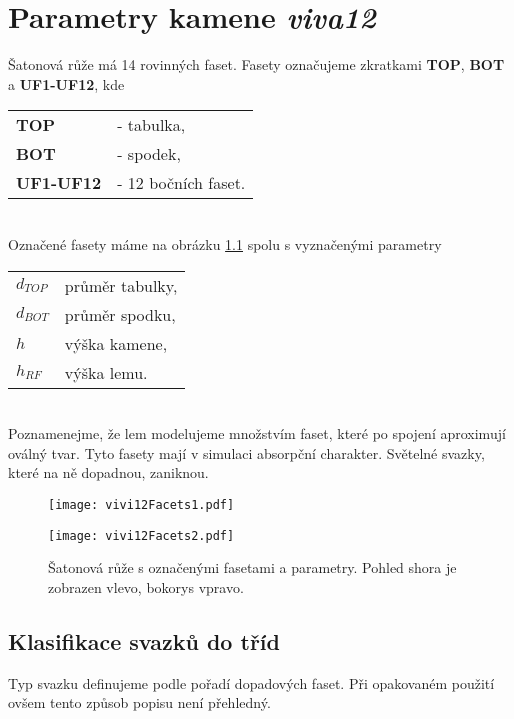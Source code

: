 \chapter{Parametry kamene \textit{viva12}}

Šatonová růže má 14 rovinných faset. Fasety označujeme zkratkami \textbf{TOP}, \textbf{BOT} a \textbf{UF1-UF12}, kde

\begin{tabular}{l l}
\textbf{TOP} & - tabulka,\\
\textbf{BOT} & - spodek,\\
\textbf{UF1-UF12} & - 12 bočních faset.\\
\end{tabular}\\

Označené fasety máme na obrázku \ref{fig:viva12Params} spolu s vyznačenými parametry

\begin{tabular}{l l}
$d_{TOP}$ & průměr tabulky,\\
$d_{BOT}$ & průměr spodku,\\
$h$ & výška kamene,\\
$h_{RF}$ & výška lemu. 
\end{tabular}\\
 
Poznamenejme, že lem modelujeme množstvím faset, které po spojení aproximují oválný tvar. Tyto fasety mají v simulaci absorpční charakter. Světelné svazky, které na ně dopadnou, zaniknou.   

\begin{figure}[htps]
\centering
\begin{minipage}[c]{0.4\textwidth}
\texttt{[image: vivi12Facets1.pdf]}
\end{minipage}
\begin{minipage}[c]{0.56\textwidth}
\texttt{[image: vivi12Facets2.pdf]}
\end{minipage}
\caption{Šatonová růže s označenými fasetami a parametry. Pohled shora je zobrazen vlevo, bokorys vpravo.}
\label{fig:viva12Params}
\end{figure}

\section{Klasifikace svazků do tříd}
Typ svazku definujeme podle pořadí dopadových faset. Při opakovaném použití ovšem tento způsob popisu není přehledný.


